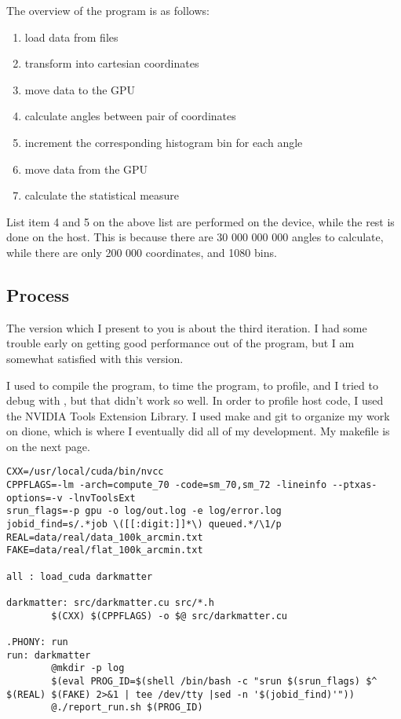 \documentclass[a4paper,titlepage,12pt]{article}
\begin{document}
\begin{description}[left = \parindent]
The overview of the program is as follows:
\begin{enumerate}
	\item load data from files
	\item transform into cartesian coordinates
	\item move data to the GPU
	\item calculate angles between pair of coordinates
	\item increment the corresponding histogram bin for each angle
	\item move data from the GPU
	\item calculate the statistical measure
\end{enumerate}

\vspace{0.5cm}
\noindent List item 4 and 5 on the above list are performed on the device, while the rest is done on the host.
This is because there are 30 000 000 000 angles to calculate, while there are only 200 000 coordinates, and 1080 bins.

\subsection{Process}

The version which I present to you is about the third iteration.
I had some trouble early on getting good performance out of the program, but I am somewhat satisfied with this version.

I used  to compile the program,  to time the program,  to profile, and I tried to debug with , but that didn't work so well.
In order to profile host code, I used the NVIDIA Tools Extension Library.
I used make and git to organize my work on dione, which is where I eventually did all of my development.
My makefile is on the next page.

\newpage
\begin{lstlisting}[caption=the project makefile]
CXX=/usr/local/cuda/bin/nvcc
CPPFLAGS=-lm -arch=compute_70 -code=sm_70,sm_72 -lineinfo --ptxas-options=-v -lnvToolsExt
srun_flags=-p gpu -o log/out.log -e log/error.log
jobid_find=s/.*job \([[:digit:]]*\) queued.*/\1/p
REAL=data/real/data_100k_arcmin.txt
FAKE=data/real/flat_100k_arcmin.txt

all : load_cuda darkmatter

darkmatter: src/darkmatter.cu src/*.h
        $(CXX) $(CPPFLAGS) -o $@ src/darkmatter.cu

.PHONY: run
run: darkmatter
        @mkdir -p log
        $(eval PROG_ID=$(shell /bin/bash -c "srun $(srun_flags) $^ $(REAL) $(FAKE) 2>&1 | tee /dev/tty |sed -n '$(jobid_find)'"))
        @./report_run.sh $(PROG_ID)


\end{lstlisting}
\end{description}
\end{document}
